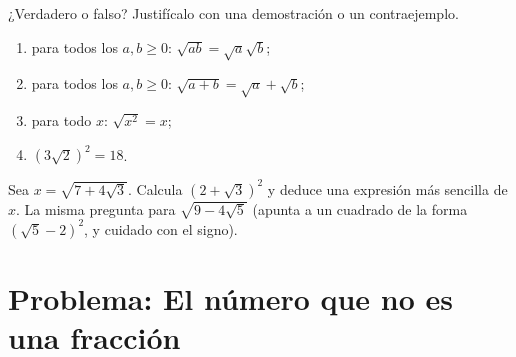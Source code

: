\begin{exercise}[$\star\star$]\label{exo:g9:sqrt:9}
¿Verdadero o falso? Justifícalo con una demostración o un contraejemplo.
\begin{enumerate}
  \item para todos los $a, b \geq 0$: $\sqrt{ab} = \sqrt a \sqrt b$;
  \item para todos los $a, b \geq 0$: $\sqrt{a+b} = \sqrt a + \sqrt b$;
  \item para todo $x$: $\sqrt{x^2} = x$;
  \item $\left(3\sqrt2\right)^2 = 18$.
\end{enumerate}
\end{exercise}

\begin{exercise}[$\star\star\star$]\label{exo:g9:sqrt:10}
Sea $x = \sqrt{7 + 4\sqrt3}$. Calcula
$\left(2 + \sqrt3\right)^2$ y deduce una expresión más sencilla de $x$.
La misma pregunta para $\sqrt{9 - 4\sqrt5}$ (apunta a un cuadrado de la forma
$\left(\sqrt5 - 2\right)^2$, y cuidado con el signo).
\end{exercise}

\section{Problema: El número que no es una fracción}

